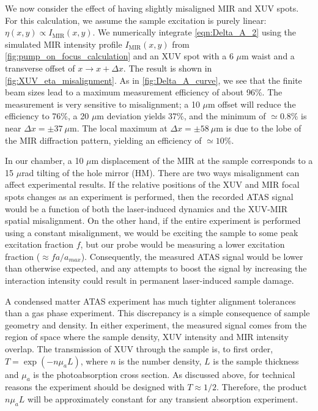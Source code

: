 We now consider the effect of having slightly misaligned MIR and XUV spots. For this calculation, we assume the sample excitation is purely linear: $\eta(x,y) \propto I_{\textrm{MIR}}(x,y)$. We numerically integrate \cref{eqn:Delta_A_2} using the simulated MIR intensity profile $I_{\textrm{MIR}}(x,y)$ from \cref{fig:pump_on_focus_calculation} and an XUV spot with a 6 $\mu$m waist and a transverse offset of $x \rightarrow x+\Delta x$. The result is shown in \cref{fig:XUV_eta_misalignment}. As in \cref{fig:Delta_A_curve}, we see that the finite beam sizes lead to a maximum measurement efficiency of about 96\%. The measurement is very sensitive to misalignment; a 10 $\mu$m offset will reduce the efficiency to 76\%, a 20 $\mu$m deviation yields 37\%, and the minimum of $\simeq 0.8\%$ is near $\Delta x = \pm 37 \ \mu \textrm{m}$. The local maximum at $\Delta x = \pm 58 \ \mu \textrm{m}$ is due to the  lobe of the MIR diffraction pattern, yielding an efficiency of $\simeq 10\%$.

In our chamber, a 10 $\mu$m displacement of the MIR at the sample corresponds to a 15 $\mu$rad tilting of the hole mirror (HM). There are two ways misalignment can affect experimental results. If the relative positions of the XUV and MIR focal spots changes as an experiment is performed, then the recorded ATAS signal would be a function of both the laser-induced dynamics and the XUV-MIR spatial misalignment. On the other hand, if the entire experiment is performed using a constant misalignment, we would be exciting the sample to some peak excitation fraction $f$, but our probe would be measuring a lower excitation fraction ($\approx f a / a_{max}$). Consequently, the measured ATAS signal would be lower than otherwise expected, and any attempts to boost the signal by increasing the interaction intensity could result in permanent laser-induced sample damage.

A condensed matter ATAS experiment has much tighter alignment tolerances than a gas phase experiment. This discrepancy is a simple consequence of sample geometry and density. In either experiment, the measured signal comes from the region of space where the sample density, XUV intensity and MIR intensity overlap. The transmission of XUV through the sample is, to first order, $T= \exp(- n \mu_a L)$, where $n$ is the number density, $L$ is the sample thickness and $\mu_a$ is the photoabsorption cross section. As discussed above, for technical reasons the experiment should be designed with $T \approx 1/2$. Therefore, the product $n \mu_a L$ will be approximately constant for any transient absorption experiment.

